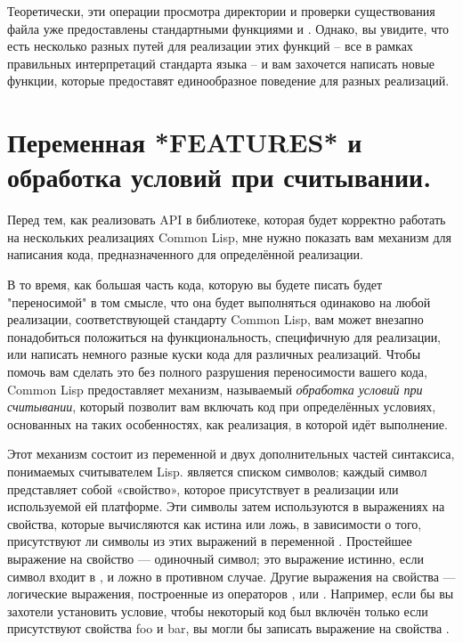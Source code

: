 Теоретически, эти операции просмотра директории и проверки существования файла уже
предоставлены стандартными функциями  и . Однако, вы
увидите, что есть несколько разных путей для реализации этих функций -- все в рамках
правильных интерпретаций стандарта языка -- и вам захочется написать новые функции,
которые предоставят единообразное поведение для разных реализаций.

\section{Переменная *FEATURES* и обработка условий при считывании.}

Перед тем, как реализовать API в библиотеке, которая будет корректно работать на
нескольких реализациях Common Lisp, мне нужно показать вам механизм для написания кода,
предназначенного для определённой реализации.

В то время, как большая часть кода, которую вы будете писать будет "переносимой" в том
смысле, что она будет выполняться одинаково на любой реализации, соответствующей стандарту
Common Lisp, вам может внезапно понадобиться положиться на функциональность, специфичную
для реализации, или написать немного разные куски кода для различных реализаций. Чтобы
помочь вам сделать это без полного разрушения переносимости вашего кода, Common Lisp
предоставляет механизм, называемый \textit{обработка условий при считывании}, который
позволит вам включать код при определённых условиях, основанных на таких особенностях, как
реализация, в которой идёт выполнение.

Этот механизм состоит из переменной  и двух дополнительных частей
синтаксиса, понимаемых считывателем Lisp.  является списком символов;
каждый символ представляет собой «свойство», которое присутствует в реализации или
используемой ей платформе. Эти символы затем используются в выражениях на свойства,
которые вычисляются как истина или ложь, в зависимости о того, присутствуют ли символы из
этих выражений в переменной . Простейшее выражение на свойство ---
одиночный символ; это выражение истинно, если символ входит в , и ложно в
противном случае. Другие выражения на свойства --- логические выражения, построенные из
операторов ,  или . Например, если бы вы захотели установить
условие, чтобы некоторый код был включён только если присутствуют свойства foo и bar, вы
могли бы записать выражение на свойства .

